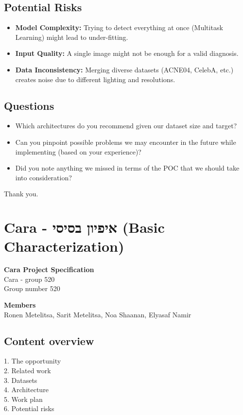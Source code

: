 \documentclass[12pt,a4paper]{article}
\begin{document}
\subsection{Potential Risks}
\begin{itemize}
    \item \textbf{Model Complexity:} Trying to detect everything at once (Multitask Learning) might lead to under-fitting.
    \item \textbf{Input Quality:} A single image might not be enough for a valid diagnosis.
    \item \textbf{Data Inconsistency:} Merging diverse datasets (ACNE04, CelebA, etc.) creates noise due to different lighting and resolutions.
\end{itemize}

\subsection{Questions}
\begin{itemize}
    \item Which architectures do you recommend given our dataset size and target?
    \item Can you pinpoint possible problems we may encounter in the future while implementing (based on your experience)?
    \item Did you note anything we missed in terms of the POC that we should take into consideration?
\end{itemize}
Thank you.

\newpage
\section{Cara - איפיון בסיסי (Basic Characterization)}

\textbf{Cara Project Specification}\\
Cara - group 520\\
Group number 520

\textbf{Members}\\
Ronen Metelitsa, Sarit Metelitsa, Noa Shaanan, Elyasaf Namir

\subsection{Content overview}
1. The opportunity\\
2. Related work\\
3. Datasets\\
4. Architecture\\
5. Work plan\\
6. Potential risks
\end{document}
